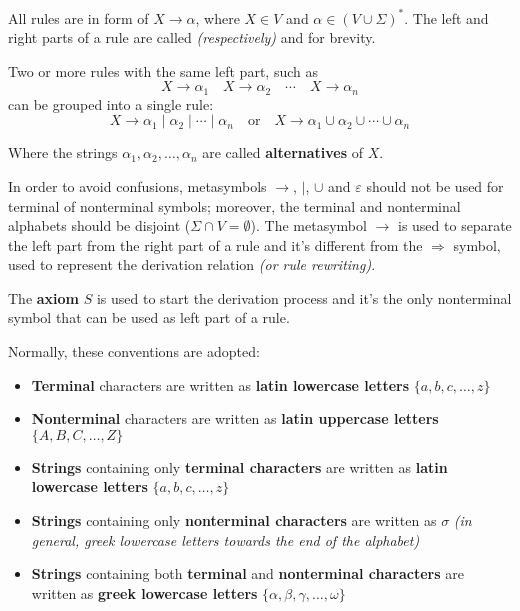 \documentclass[english]{article}
\begin{document}
All rules are in form of \(X \rightarrow \alpha\), where \(X \in V\) and \(\alpha \in (V \cup \Sigma)^\ast\).
The left and right parts of a rule are called \textit{(respectively)} \textbf{\LP} and \textbf{\RP} for brevity.

Two or more rules with the same left part, such as
\[ X \rightarrow \alpha_1 \quad X \rightarrow \alpha_2\quad \cdots \quad X \rightarrow \alpha_n \]
can be grouped into a single rule:
\[ X \rightarrow \alpha_1 \mid \alpha_2 \mid \cdots  \mid \alpha_n \quad \text{or} \quad X \rightarrow \alpha_1 \cup \alpha_2 \cup \cdots \cup \alpha_n \]

Where the strings \(\alpha_1, \alpha_2, \ldots, \alpha_n\) are called \textbf{alternatives} of \(X\).

In order to avoid confusions, metasymbols \(\rightarrow\), \(|\), \(\cup\) and \(\varepsilon\) should not be used for terminal of nonterminal symbols;
moreover, the terminal and nonterminal alphabets should be disjoint (\(\Sigma \cap V = \emptyset\)).
The metasymbol \(\rightarrow\) is used to separate the left part from the right part of a rule and it's different from the \(\Rightarrow\) symbol, used to represent the derivation relation \textit{(or rule rewriting)}.

The \textbf{axiom} \(S\) is used to start the derivation process and it's the only nonterminal symbol that can be used as left part of a rule.

\bigskip
Normally, these conventions are adopted:

\begin{itemize}
  \item \textbf{Terminal} characters are written as \textbf{latin lowercase letters} \(\{a, b, c, \ldots, z\}\)
  \item \textbf{Nonterminal} characters are written as \textbf{latin uppercase letters} \(\{A, B, C, \ldots, Z\}\)
  \item \textbf{Strings} containing only \textbf{terminal characters} are written as \textbf{latin lowercase letters} \(\{a, b, c, \ldots, z\}\)
  \item \textbf{Strings} containing only \textbf{nonterminal characters} are written as \(\sigma\) \textit{(in general, greek lowercase letters towards the end of the alphabet)}
  \item \textbf{Strings} containing both \textbf{terminal} and \textbf{nonterminal characters} are written as \textbf{greek lowercase letters} \(\{\alpha, \beta, \gamma, \ldots, \omega\}\)
\end{itemize}
\end{document}
